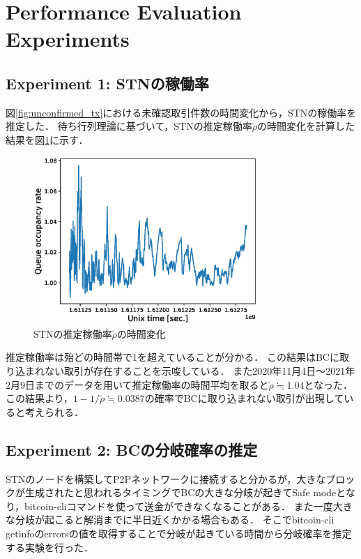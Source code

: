 \documentclass[graybox]{svmult}
\begin{document}
\section{Performance Evaluation Experiments}
\label{sec:experiments}

\subsection{Experiment 1: STNの稼働率}
\label{sec:occupancyrate}

図\ref{fig:unconfirmed_tx}における未確認取引件数の時間変化から，STNの稼働率を推定した．
待ち行列理論に基づいて，STNの推定稼働率$\tilde{\rho}$の時間変化を計算した結果を図\ref{fig:occupancyrate}に示す．
%
\begin{figure}[tb]
  \vspace{-45mm}
  \begin{center}
    \includegraphics[width=85mm]{bsv_stn-rho-queue_occupancy_rate.eps}
  \end{center}
  \vspace{45mm}
  \caption{STNの推定稼働率$\tilde{\rho}$の時間変化}
  \label{fig:occupancyrate}
\end{figure}
%
推定稼働率は殆どの時間帯で1を超えていることが分かる．
この結果はBCに取り込まれない取引が存在することを示唆している．
また2020年11月4日〜2021年2月9日までのデータを用いて推定稼働率の時間平均を取ると$\tilde{\rho} \fallingdotseq 1.04$となった．
この結果より，$1-1/\tilde{\rho} \fallingdotseq 0.0387$の確率でBCに取り込まれない取引が出現していると考えられる．



\subsection{Experiment 2: BCの分岐確率の推定}
\label{sec:sork}

STNのノードを構築してP2Pネットワークに接続すると分かるが，大きなブロックが生成されたと思われるタイミングでBCの大きな分岐が起きてSafe modeとなり，bitcoin-cliコマンドを使って送金ができなくなることがある．
また一度大きな分岐が起こると解消までに半日近くかかる場合もある．
そこでbitcoin-cli getinfoのerrorsの値を取得することで分岐が起きている時間から分岐確率を推定する実験を行った．
\end{document}
